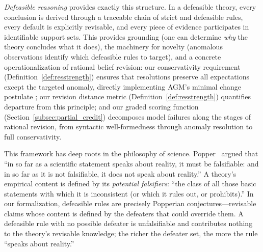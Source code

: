 \documentclass{article}
\theoremstyle{definition}
\begin{document}
\textit{Defeasible reasoning} provides exactly this structure. In a defeasible theory, every conclusion is derived through a traceable chain of strict and defeasible rules, every default is explicitly revisable, and every piece of evidence participates in identifiable support sets. This provides grounding (one can determine \emph{why} the theory concludes what it does), the machinery for novelty (anomalous observations identify which defeasible rules to target), and a concrete operationalization of rational belief revision: our conservativity requirement (Definition~\ref{def:resstrength}) ensures that resolutions preserve all expectations except the targeted anomaly, directly implementing AGM's minimal change postulate \cite{gardenfors1988knowledge, katsuno1991propositional}; our revision distance metric (Definition~\ref{def:resstrength}) quantifies departure from this principle; and our graded scoring function (Section~\ref{subsec:partial_credit}) decomposes model failures along the stages of rational revision, from syntactic well-formedness through anomaly resolution to full conservativity.

This framework has deep roots in the philosophy of science. Popper~\cite{popper1959logic} argued that ``in so far as a scientific statement speaks about reality, it must be falsifiable: and in so far as it is not falsifiable, it does not speak about reality.'' A theory's empirical content is defined by its \emph{potential falsifiers}: ``the class of all those basic statements with which it is inconsistent (or which it rules out, or prohibits).'' In our formalization, defeasible rules are precisely Popperian conjectures---revisable claims whose content is defined by the defeaters that could override them. A defeasible rule with no possible defeater is unfalsifiable and contributes nothing to the theory's revisable knowledge; the richer the defeater set, the more the rule ``speaks about reality.''
\end{document}
